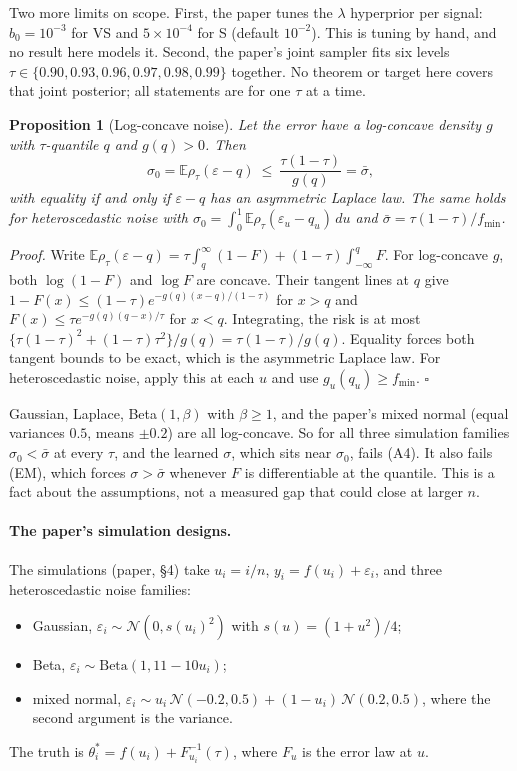 \documentclass[11pt]{article}
\newcommand{\E}{\mathbb{E}}
\newcommand{\sbar}{\bar\sigma}
\theoremstyle{plain}
\newtheorem{proposition}{Proposition}
\theoremstyle{definition}
\theoremstyle{remark}
\begin{document}
Two more limits on scope. First, the paper tunes the $\lambda$ hyperprior per signal: $b_0=10^{-3}$ for VS and $5\times10^{-4}$ for S (default $10^{-2}$). This is tuning by hand, and no result here models it. Second, the paper's joint sampler fits six levels $\tau\in\{0.90,0.93,0.96,0.97,0.98,0.99\}$ together. No theorem or target here covers that joint posterior; all statements are for one $\tau$ at a time.

\begin{proposition}[Log-concave noise]\label{prop:logconcave}
Let the error have a log-concave density $g$ with $\tau$-quantile $q$ and $g(q)>0$. Then
\[
\sigma_0=\E\rho_\tau(\varepsilon-q)\ \le\ \frac{\tau(1-\tau)}{g(q)}=\sbar,
\]
with equality if and only if $\varepsilon-q$ has an asymmetric Laplace law. The same holds for heteroscedastic noise with $\sigma_0=\int_0^1\E\rho_\tau(\varepsilon_u-q_u)\,du$ and $\sbar=\tau(1-\tau)/f_{\min}$.
\end{proposition}
\noindent\textit{Proof.} Write $\E\rho_\tau(\varepsilon-q)=\tau\int_q^\infty(1-F)+(1-\tau)\int_{-\infty}^qF$. For log-concave $g$, both $\log(1-F)$ and $\log F$ are concave. Their tangent lines at $q$ give $1-F(x)\le(1-\tau)e^{-g(q)(x-q)/(1-\tau)}$ for $x>q$ and $F(x)\le\tau e^{-g(q)(q-x)/\tau}$ for $x<q$. Integrating, the risk is at most $\{\tau(1-\tau)^2+(1-\tau)\tau^2\}/g(q)=\tau(1-\tau)/g(q)$. Equality forces both tangent bounds to be exact, which is the asymmetric Laplace law. For heteroscedastic noise, apply this at each $u$ and use $g_u(q_u)\ge f_{\min}$. \hfill$\square$

\noindent Gaussian, Laplace, Beta$(1,\beta)$ with $\beta\ge1$, and the paper's mixed normal (equal variances $0.5$, means $\pm0.2$) are all log-concave. So for all three simulation families $\sigma_0<\sbar$ at every $\tau$, and the learned $\sigma$, which sits near $\sigma_0$, fails (A4). It also fails (EM), which forces $\sigma>\sbar$ whenever $F$ is differentiable at the quantile. This is a fact about the assumptions, not a measured gap that could close at larger $n$.

\paragraph{The paper's simulation designs.} The simulations (paper, \S4) take $u_i=i/n$, $y_i=f(u_i)+\varepsilon_i$, and three heteroscedastic noise families:
\begin{itemize}
\item Gaussian, $\varepsilon_i\sim\mathcal N(0,s(u_i)^2)$ with $s(u)=(1+u^2)/4$;
\item Beta, $\varepsilon_i\sim\mathrm{Beta}(1,11-10u_i)$;
\item mixed normal, $\varepsilon_i\sim u_i\,\mathcal N(-0.2,0.5)+(1-u_i)\,\mathcal N(0.2,0.5)$, where the second argument is the variance.
\end{itemize}
The truth is $\theta^*_i=f(u_i)+F_{u_i}^{-1}(\tau)$, where $F_u$ is the error law at $u$.
\end{document}
